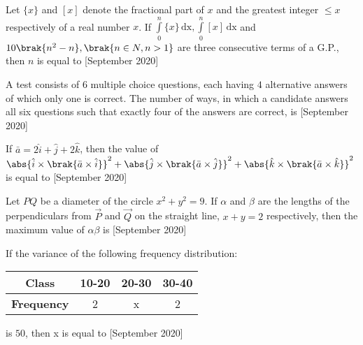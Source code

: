 \iffalse
\title{2020}
\author{EE24BTECH11066}
\section{integer}
\fi
\item Let $\{x\}$ and ${[x]}$ denote the fractional part of $x$ and the greatest integer $\leq x$ respectively of a real number $x$. If $\int\limits_0^n\{x\} \, \text{dx},\int\limits_0^n{[x]} \,\text{dx}$ and $10\brak{n^2-n},\brak{n \in N,n>1}$ are three consecutive terms of a G.P., then $n$ is equal to \underline{\hspace{1cm}} \hfill{[September 2020]}\\ 

\item A test consists of $6$ multiple choice questions, each having $4$ alternative answers of which only one is correct. The number of ways, in which a candidate answers all six questions such that exactly four of the answers are correct, is \underline{\hspace{1cm}} \hfill{[September 2020]}\\

\item If $\bar{a} = 2\hat{i} + \hat{j} + 2\hat{k}$, then the value of $\abs{\hat{i} \times \brak{\bar{a} \times \hat{i}}}^2 + \abs{\hat{j} \times \brak{\bar{a} \times \hat{j}}}^2 + \abs{\hat{k} \times \brak{\bar{a} \times \hat{k}}}^2$  is equal to \underline{\hspace{1cm}} \hfill{[September 2020]}\\

\item Let $PQ$ be a diameter of the circle $x^2+y^2=9$. If $\alpha$ and $\beta$ are the lengths of the perpendiculars from $\vec{P}$ and $\vec{Q}$ on the straight line, $x+y=2$ respectively, then the maximum value of $\alpha\beta$ is \underline{\hspace{1cm}} \hfill{[September 2020]}\\

\item If the variance of the following frequency distribution:

\begin{center}
\begin{tabular}{|c|c|c|c|}
\hline
\textbf{Class}     & 10-20 & 20-30 & 30-40 \\
\hline
\textbf{Frequency} & 2     & x     & 2     \\
\hline
\end{tabular}
\end{center}

is $50$, then  x is equal to \underline{\hspace{1cm}} \hfill{[September 2020]}

